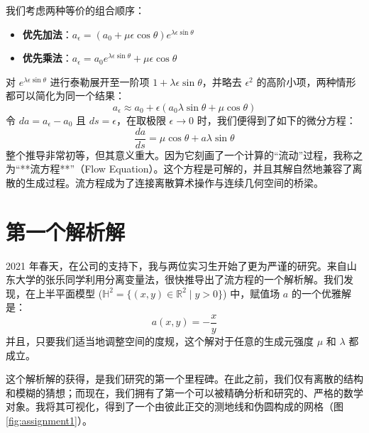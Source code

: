 \documentclass[a4paper,12pt]{book}
\numberwithin{problem}{section}
\numberwithin{definition}{section}
\numberwithin{lemma}{section}
\numberwithin{proposition}{section}
\numberwithin{theorem}{section}
\numberwithin{grammar}{section}
\numberwithin{program}{section}
\numberwithin{convention}{section}
\numberwithin{corollary}{section}
\begin{document}
我们考虑两种等价的组合顺序：
\begin{itemize}
    \item \textbf{优先加法}：$a_{\epsilon} = (a_0 + \mu \epsilon \cos \theta)e^{\lambda \epsilon \sin \theta}$
    \item \textbf{优先乘法}：$a_{\epsilon} = a_0 e^{\lambda \epsilon \sin \theta} + \mu \epsilon \cos \theta$
\end{itemize}
对 $e^{\lambda \epsilon \sin \theta}$ 进行泰勒展开至一阶项 $1 + \lambda \epsilon \sin \theta$，并略去 $\epsilon^2$ 的高阶小项，两种情形都可以简化为同一个结果：
\[ a_{\epsilon} \approx a_0 + \epsilon (a_0 \lambda \sin \theta + \mu \cos \theta) \]
令 $da = a_{\epsilon} - a_0$ 且 $ds = \epsilon$，在取极限 $\epsilon \to 0$ 时，我们便得到了如下的微分方程：
\begin{equation}
    \frac{da}{ds} = \mu \cos \theta + a \lambda \sin \theta
    \label{eq:flow_equation_derivation}
\end{equation}
整个推导非常初等，但其意义重大。因为它刻画了一个计算的“流动”过程，我称之为“**流方程**”（Flow Equation）。这个方程是可解的，并且其解自然地兼容了离散的生成过程。流方程成为了连接离散算术操作与连续几何空间的桥梁。

\section{第一个解析解}
\label{sec:first_analytical_solution}

2021 年春天，在公司的支持下，我与两位实习生开始了更为严谨的研究。来自山东大学的张乐同学利用分离变量法，很快推导出了流方程的一个解析解。我们发现，在上半平面模型 ($\mathbb{H}^2 = \{(x, y) \in \mathbb{R}^2 \mid y > 0\}$) 中，赋值场 $a$ 的一个优雅解是：
\begin{equation}
    a(x, y) = - \frac{x}{y}
    \label{eq:first_solution}
\end{equation}
并且，只要我们适当地调整空间的度规，这个解对于任意的生成元强度 $\mu$ 和 $\lambda$ 都成立。

这个解析解的获得，是我们研究的第一个里程碑。在此之前，我们仅有离散的结构和模糊的猜想；而现在，我们拥有了第一个可以被精确分析和研究的、严格的数学对象。我将其可视化，得到了一个由彼此正交的测地线和伪圆构成的网格（图 \ref{fig:assignment1}）。
\end{document}
